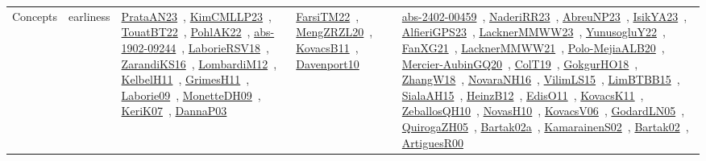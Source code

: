 {\begin{longtable}{lp{3cm}>{\raggedright\arraybackslash}p{6cm}>{\raggedright\arraybackslash}p{6cm}>{\raggedright\arraybackslash}p{8cm}}
Concepts & earliness & \href{works/PrataAN23.pdf}{PrataAN23}~\cite{PrataAN23}, \href{works/KimCMLLP23.pdf}{KimCMLLP23}~\cite{KimCMLLP23}, \href{works/TouatBT22.pdf}{TouatBT22}~\cite{TouatBT22}, \href{works/PohlAK22.pdf}{PohlAK22}~\cite{PohlAK22}, \href{works/abs-1902-09244.pdf}{abs-1902-09244}~\cite{abs-1902-09244}, \href{works/LaborieRSV18.pdf}{LaborieRSV18}~\cite{LaborieRSV18}, \href{works/ZarandiKS16.pdf}{ZarandiKS16}~\cite{ZarandiKS16}, \href{works/LombardiM12.pdf}{LombardiM12}~\cite{LombardiM12}, \href{works/KelbelH11.pdf}{KelbelH11}~\cite{KelbelH11}, \href{works/GrimesH11.pdf}{GrimesH11}~\cite{GrimesH11}, \href{works/Laborie09.pdf}{Laborie09}~\cite{Laborie09}, \href{works/MonetteDH09.pdf}{MonetteDH09}~\cite{MonetteDH09}, \href{works/KeriK07.pdf}{KeriK07}~\cite{KeriK07}, \href{works/DannaP03.pdf}{DannaP03}~\cite{DannaP03} & \href{works/FarsiTM22.pdf}{FarsiTM22}~\cite{FarsiTM22}, \href{works/MengZRZL20.pdf}{MengZRZL20}~\cite{MengZRZL20}, \href{works/KovacsB11.pdf}{KovacsB11}~\cite{KovacsB11}, \href{works/Davenport10.pdf}{Davenport10}~\cite{Davenport10} & \href{works/abs-2402-00459.pdf}{abs-2402-00459}~\cite{abs-2402-00459}, \href{works/NaderiRR23.pdf}{NaderiRR23}~\cite{NaderiRR23}, \href{works/AbreuNP23.pdf}{AbreuNP23}~\cite{AbreuNP23}, \href{works/IsikYA23.pdf}{IsikYA23}~\cite{IsikYA23}, \href{works/AlfieriGPS23.pdf}{AlfieriGPS23}~\cite{AlfieriGPS23}, \href{works/LacknerMMWW23.pdf}{LacknerMMWW23}~\cite{LacknerMMWW23}, \href{works/YunusogluY22.pdf}{YunusogluY22}~\cite{YunusogluY22}, \href{works/FanXG21.pdf}{FanXG21}~\cite{FanXG21}, \href{works/LacknerMMWW21.pdf}{LacknerMMWW21}~\cite{LacknerMMWW21}, \href{works/Polo-MejiaALB20.pdf}{Polo-MejiaALB20}~\cite{Polo-MejiaALB20}, \href{works/Mercier-AubinGQ20.pdf}{Mercier-AubinGQ20}~\cite{Mercier-AubinGQ20}, \href{works/ColT19.pdf}{ColT19}~\cite{ColT19}, \href{works/GokgurHO18.pdf}{GokgurHO18}~\cite{GokgurHO18}, \href{works/ZhangW18.pdf}{ZhangW18}~\cite{ZhangW18}, \href{works/NovaraNH16.pdf}{NovaraNH16}~\cite{NovaraNH16}, \href{works/VilimLS15.pdf}{VilimLS15}~\cite{VilimLS15}, \href{works/LimBTBB15.pdf}{LimBTBB15}~\cite{LimBTBB15}, \href{works/SialaAH15.pdf}{SialaAH15}~\cite{SialaAH15}, \href{works/HeinzB12.pdf}{HeinzB12}~\cite{HeinzB12}, \href{works/EdisO11.pdf}{EdisO11}~\cite{EdisO11}, \href{works/KovacsK11.pdf}{KovacsK11}~\cite{KovacsK11}, \href{works/ZeballosQH10.pdf}{ZeballosQH10}~\cite{ZeballosQH10}, \href{works/NovasH10.pdf}{NovasH10}~\cite{NovasH10}, \href{works/KovacsV06.pdf}{KovacsV06}~\cite{KovacsV06}, \href{works/GodardLN05.pdf}{GodardLN05}~\cite{GodardLN05}, \href{works/QuirogaZH05.pdf}{QuirogaZH05}~\cite{QuirogaZH05}, \href{works/Bartak02a.pdf}{Bartak02a}~\cite{Bartak02a}, \href{works/KamarainenS02.pdf}{KamarainenS02}~\cite{KamarainenS02}, \href{works/Bartak02.pdf}{Bartak02}~\cite{Bartak02}, \href{works/ArtiguesR00.pdf}{ArtiguesR00}~\cite{ArtiguesR00}\\

\end{longtable}}
